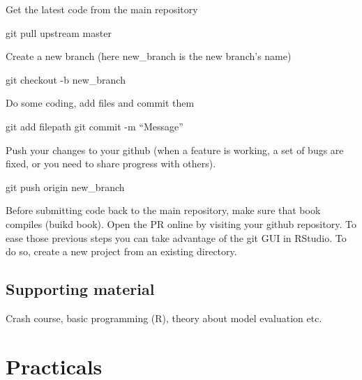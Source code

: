 \documentclass[12pt,oneside]{book}
\newenvironment{Shaded}{\begin{snugshade}}{\end{snugshade}}
\newcommand{\FunctionTok}[1]{\textcolor[rgb]{0.00,0.00,0.00}{#1}}
\newcommand{\NormalTok}[1]{#1}
\begin{document}
Get the latest code from the main repository

\begin{Shaded}
\begin{Highlighting}[]
\FunctionTok{git}\NormalTok{ pull upstream master}
\end{Highlighting}
\end{Shaded}

Create a new branch (here new\_branch is the new branch's name)

\begin{Shaded}
\begin{Highlighting}[]
\FunctionTok{git}\NormalTok{ checkout -b new_branch}
\end{Highlighting}
\end{Shaded}

Do some coding, add files and commit them

\begin{Shaded}
\begin{Highlighting}[]
\FunctionTok{git}\NormalTok{ add filepath}
\FunctionTok{git}\NormalTok{ commit -m “Message”}
\end{Highlighting}
\end{Shaded}

Push your changes to your github (when a feature is working, a set of
bugs are fixed, or you need to share progress with others).

\begin{Shaded}
\begin{Highlighting}[]
\FunctionTok{git}\NormalTok{ push origin new_branch}
\end{Highlighting}
\end{Shaded}

Before submitting code back to the main repository, make sure that book
compiles (buikd book). Open the PR online by visiting your github
repository. To ease those previous steps you can take advantage of the
git GUI in RStudio. To do so, create a new project from an existing
directory.

\chapter*{Supporting material}\label{supporting-material}

Crash course, basic programming (R), theory about model evaluation etc.

\part{Practicals}\label{part-practicals}
\end{document}
